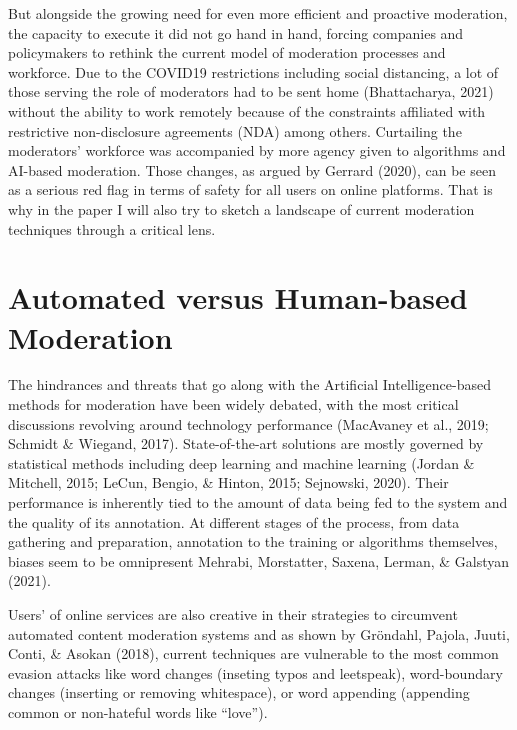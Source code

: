 \documentclass[
  10pt,
  dvipsnames,enabledeprecatedfontcommands]{scrartcl}
\begin{document}
But alongside the growing need for even more efficient and proactive
moderation, the capacity to execute it did not go hand in hand, forcing
companies and policymakers to rethink the current model of moderation
processes and workforce. Due to the COVID19 restrictions including
social distancing, a lot of those serving the role of moderators had to
be sent home (Bhattacharya, 2021) without the ability to work remotely
because of the constraints affiliated with restrictive non-disclosure
agreements (NDA) among others. Curtailing the moderators' workforce was
accompanied by more agency given to algorithms and AI-based moderation.
Those changes, as argued by Gerrard (2020), can be seen as a serious red
flag in terms of safety for all users on online platforms. That is why
in the paper I will also try to sketch a landscape of current moderation
techniques through a critical lens.

\hypertarget{automated-versus-human-based-moderation}{%
\section{Automated versus Human-based
Moderation}\label{automated-versus-human-based-moderation}}

The hindrances and threats that go along with the Artificial
Intelligence-based methods for moderation have been widely debated, with
the most critical discussions revolving around technology performance
(MacAvaney et al., 2019; Schmidt \& Wiegand, 2017). State-of-the-art
solutions are mostly governed by statistical methods including deep
learning and machine learning (Jordan \& Mitchell, 2015; LeCun, Bengio,
\& Hinton, 2015; Sejnowski, 2020). Their performance is inherently tied
to the amount of data being fed to the system and the quality of its
annotation. At
different stages of the process, from data gathering and preparation,
annotation to the training or algorithms themselves, biases seem to be
omnipresent Mehrabi, Morstatter, Saxena, Lerman, \& Galstyan (2021).

Users' of online
services are also creative in their strategies to circumvent automated
content moderation systems and as shown by Gröndahl, Pajola, Juuti,
Conti, \& Asokan (2018), current techniques are vulnerable to the most
common evasion attacks like word changes (inseting typos and leetspeak),
word-boundary changes (inserting or removing whitespace), or word
appending (appending common or non-hateful words like ``love'').
\end{document}
